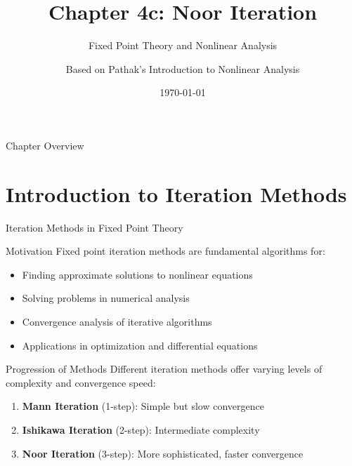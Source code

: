 \documentclass[aspectratio=169,10pt]{beamer}
\title{Chapter 4c: Noor Iteration}
\subtitle{Fixed Point Theory and Nonlinear Analysis}
\author{Based on Pathak's Introduction to Nonlinear Analysis}
\date{\today}
\begin{document}
\frame{\titlepage}


\begin{frame}{Chapter Overview}
\tableofcontents
\end{frame}


\section{Introduction to Iteration Methods}

\begin{frame}{Iteration Methods in Fixed Point Theory}

\begin{block}{Motivation}
Fixed point iteration methods are fundamental algorithms for:
\begin{itemize}
  \item Finding approximate solutions to nonlinear equations
  \item Solving problems in numerical analysis
  \item Convergence analysis of iterative algorithms
  \item Applications in optimization and differential equations
\end{itemize}
\end{block}

\vspace{0.3cm}

\begin{block}{Progression of Methods}
Different iteration methods offer varying levels of complexity and convergence speed:
\begin{enumerate}
  \item \textbf{Mann Iteration} (1-step): Simple but slow convergence
  \item \textbf{Ishikawa Iteration} (2-step): Intermediate complexity
  \item \textbf{Noor Iteration} (3-step): More sophisticated, faster convergence
\end{enumerate}
\end{block}

\end{frame}
\end{document}
